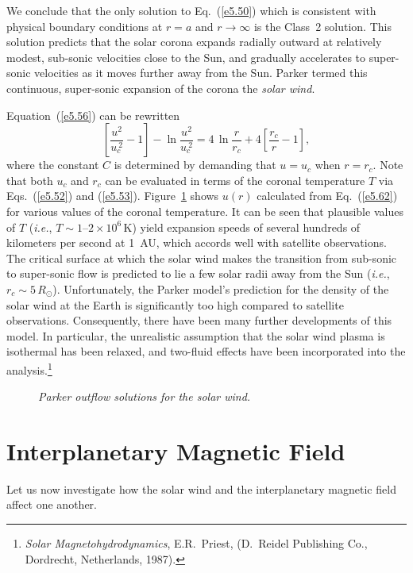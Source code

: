 We conclude that the only solution to Eq.~(\ref{e5.50}) which is consistent
with physical boundary conditions at $r=a$ and $r\rightarrow\infty$ is
the Class~2 solution. This solution predicts that the
solar corona expands radially outward at
relatively modest, sub-sonic velocities close to the Sun,
 and gradually accelerates
to super-sonic velocities as it moves further away from the Sun.
Parker termed this continuous, super-sonic expansion of the corona
the {\em solar wind}. 

Equation~(\ref{e5.56}) can be rewritten
\begin{equation}\label{e5.62}
\left[\frac{u^2}{u_c^{~2}}-1\right] -\ln\frac{u^2}{u_c^{~2}}
= 4\,\ln\frac{r}{r_c} + 4\left[\frac{r_c}{r}-1\right],
\end{equation}
where the constant $C$ is determined  by demanding that
$u=u_c$ when $r=r_c$. Note that both $u_c$ and $r_c$ can be evaluated
in terms of the coronal temperature $T$ via Eqs.~(\ref{e5.52}) and (\ref{e5.53}).
Figure~\ref{f20} shows $u(r)$ calculated  from Eq.~(\ref{e5.62}) for various values
of the coronal temperature. It can be seen that plausible
values of $T$ ({\em i.e.}, $T\sim 1$--$2\times 10^6$\,K) yield
expansion speeds of several hundreds of kilometers per second
at 1~AU, which  accords well with satellite observations. The critical
surface  at which the solar wind makes the transition from sub-sonic to
super-sonic flow is predicted to lie a few solar radii away from the Sun
({\em i.e.}, $r_c\sim 5\,R_\odot$). Unfortunately, the Parker model's
prediction for the density of the solar wind at the Earth is significantly
too high compared to satellite observations. Consequently, there have
been many further developments of this model. In particular, the
unrealistic assumption that the solar wind plasma is isothermal has been relaxed, and
two-fluid effects have been incorporated into the analysis.\footnote{{\em Solar Magnetohydrodynamics}, E.R.~Priest, (D.~Reidel
Publishing Co., Dordrecht, Netherlands, 1987).}

\begin{figure}
\epsfysize=4in
\centerline{}
\caption{\em Parker outflow solutions for the solar wind.}\label{f20}
\end{figure}

\section{Interplanetary  Magnetic Field}\label{s5.7}
Let us now investigate how the solar wind and  the interplanetary magnetic
field affect one another. 

